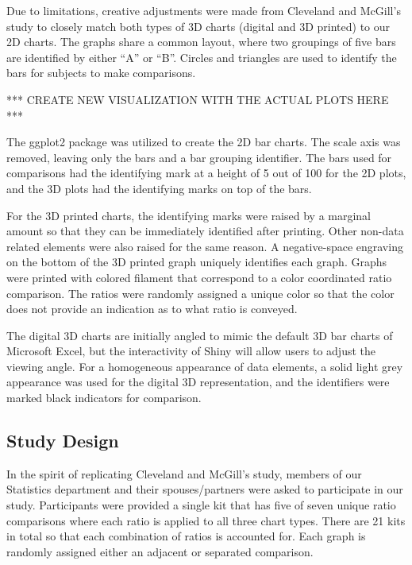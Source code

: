 \documentclass[letterpaper,inpress]{jdsart}
\begin{document}
Due to limitations, creative adjustments were made from Cleveland and McGill's study to closely match both types of 3D charts (digital and 3D printed) to our 2D charts.
The graphs share a common layout, where two groupings of five bars are identified by either ``A'' or ``B''.
Circles and triangles are used to identify the bars for subjects to make comparisons.

*** CREATE NEW VISUALIZATION WITH THE ACTUAL PLOTS HERE ***

The ggplot2 package was utilized to create the 2D bar charts.
The scale axis was removed, leaving only the bars and a bar grouping identifier.
The bars used for comparisons had the identifying mark at a height of 5 out of 100 for the 2D plots, and the 3D plots had the identifying marks on top of the bars.

For the 3D printed charts, the identifying marks were raised by a marginal amount so that they can be immediately identified after printing.
Other non-data related elements were also raised for the same reason.
A negative-space engraving on the bottom of the 3D printed graph uniquely identifies each graph.
Graphs were printed with colored filament that correspond to a color coordinated ratio comparison.
The ratios were randomly assigned a unique color so that the color does not provide an indication as to what ratio is conveyed.

The digital 3D charts are initially angled to mimic the default 3D bar charts of Microsoft Excel, but the interactivity of Shiny will allow users to adjust the viewing angle.
For a homogeneous appearance of data elements, a solid light grey appearance was used for the digital 3D representation, and the identifiers were marked black indicators for comparison.

\hypertarget{study-design}{%
\subsection{Study Design}\label{study-design}}

In the spirit of replicating Cleveland and McGill's study, members of our Statistics department and their spouses/partners were asked to participate in our study.
Participants were provided a single kit that has five of seven unique ratio comparisons where each ratio is applied to all three chart types.
There are 21 kits in total so that each combination of ratios is accounted for.
Each graph is randomly assigned either an adjacent or separated comparison.
\end{document}
